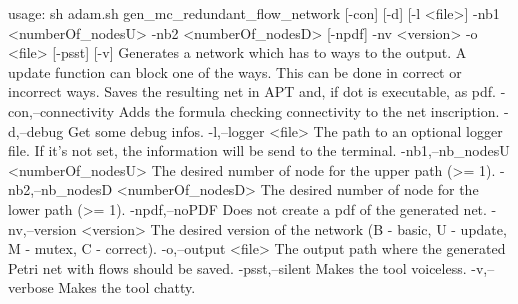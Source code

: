 usage: sh adam.sh gen_mc_redundant_flow_network [-con] [-d] [-l <file>] -nb1 <numberOf_nodesU>
       -nb2 <numberOf_nodesD> [-npdf] -nv <version> -o <file> [-psst] [-v]
Generates a network which has to ways to the output. A update function can block one of the
ways. This can be done in correct or incorrect ways. Saves the resulting net in APT and, if
dot is executable, as pdf.
 -con,--connectivity                  Adds the formula checking connectivity to the net
                                      inscription.
 -d,--debug                           Get some debug infos.
 -l,--logger <file>                   The path to an optional logger file. If it's not set,
                                      the information will be send to the terminal.
 -nb1,--nb_nodesU <numberOf_nodesU>   The desired number of node for the upper path (>= 1).
 -nb2,--nb_nodesD <numberOf_nodesD>   The desired number of node for the lower path (>= 1).
 -npdf,--noPDF                        Does not create a pdf of the generated net.
 -nv,--version <version>              The desired version of the network (B - basic, U -
                                      update, M - mutex, C - correct).
 -o,--output <file>                   The output path where the generated Petri net with flows
                                      should be saved.
 -psst,--silent                       Makes the tool voiceless.
 -v,--verbose                         Makes the tool chatty.

